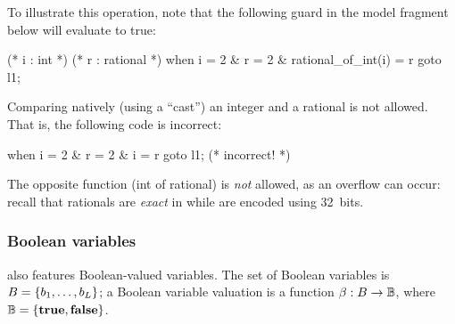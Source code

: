 \begin{example}
	To illustrate this operation, note that the following guard in the model fragment below will evaluate to true:

	\begin{IMITATORmodel}
		(* i : int *)
		(* r : rational *)
		when i = 2 & r = 2 & rational_of_int(i) = r goto l1;
	\end{IMITATORmodel}
\end{example}

\begin{remark}
	Comparing natively (using a ``cast'') an integer and a rational is not allowed.
	That is, the following code is incorrect:

		\begin{IMITATORmodel}
			when i = 2 & r = 2 & i = r goto l1; (* incorrect! *)
		\end{IMITATORmodel}
\end{remark}

The opposite function (int of rational) is \emph{not} allowed, as an overflow can occur: recall that rationals are \emph{exact} in \imitator{} while  are encoded using 32~bits.


\subsubsection{Boolean variables}

\imitator{} also features Boolean-valued variables.
The set of Boolean variables is $B = \{ b_1, \dots, b_L \} $;
a Boolean variable valuation is a function $\beta : B \rightarrow \mathbb B$, where $\mathbb B = \{\mathbf{true}, \mathbf{false} \}$.

